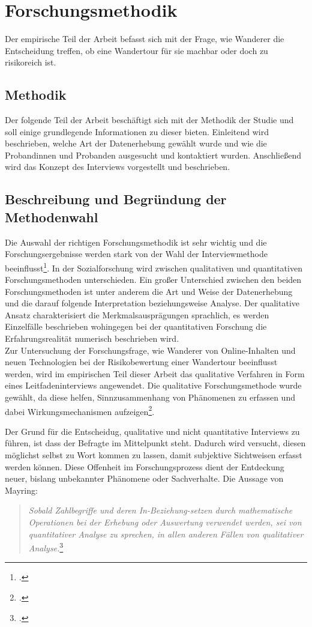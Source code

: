 \chapter{Forschungsmethodik}
\label{forschungsmethodik}

Der empirische Teil der Arbeit befasst sich mit der Frage, wie Wanderer die Entscheidung treffen, ob eine Wandertour für sie machbar oder doch zu risikoreich ist.

\section{Methodik}
\label{methodik}

Der folgende Teil der Arbeit beschäftigt sich mit der Methodik der Studie und soll einige grundlegende Informationen zu dieser bieten. Einleitend wird beschrieben, welche Art der Datenerhebung gewählt wurde und wie die Probandinnen und Probanden ausgesucht und kontaktiert wurden. Anschließend wird das Konzept des Interviews vorgestellt und beschrieben.

\section{Beschreibung und Begründung der Methodenwahl}
Die Auswahl der richtigen Forschungsmethodik ist sehr wichtig und die Forschungsergebnisse werden stark von der Wahl der Interviewmethode beeinflusst\footcite[S. 186]{kruse}. 
In der Sozialforschung wird zwischen qualitativen und quantitativen Forschungsmethoden unterschieden. Ein großer Unterschied zwischen den beiden Forschungsmethoden ist unter anderem die Art und Weise der Datenerhebung und die darauf folgende Interpretation beziehungsweise Analyse. Der qualitative Ansatz charakterisiert die Merkmalsausprägungen sprachlich, es werden Einzelfälle beschrieben wohingegen bei der quantitativen Forschung die Erfahrungsrealität numerisch beschrieben wird.\\
Zur Untersuchung der Forschungsfrage, wie Wanderer von Online-Inhalten und neuen Technologien bei der Risikobewertung einer Wandertour beeinflusst werden, wird im empirischen Teil dieser Arbeit das qualitative Verfahren in Form eines Leitfadeninterviews angewendet. Die qualitative Forschungsmethode wurde gewählt, da diese helfen, Sinnzusammenhang von Phänomenen zu erfassen und dabei Wirkungsmechanismen aufzeigen\footcite[S. 117-133]{przyborski}. 

Der Grund für die Entscheidug, qualitative und nicht quantitative Interviews zu führen, ist dass der Befragte im Mittelpunkt steht. Dadurch wird versucht, diesen möglichst selbst zu Wort kommen zu lassen, damit subjektive Sichtweisen erfasst werden können. Diese Offenheit im Forschungsprozess dient der Entdeckung neuer, bislang unbekannter Phänomene oder Sachverhalte. Die Aussage von Mayring:
\begin{quote}
	\textit{ {\glqq Sobald Zahlbegriffe und deren In-Beziehung-setzen durch mathematische Operationen bei der Erhebung oder Auswertung verwendet werden, sei von quantitativer Analyse zu sprechen, in allen anderen Fällen von qualitativer Analyse.\grqq}}\footcite[S. 17]{mayring}
\end{quote}

